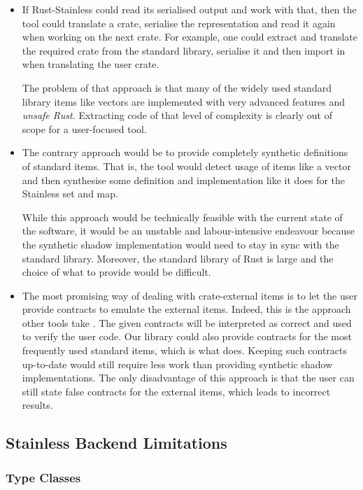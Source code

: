 \begin{itemize}
\item
  If Rust-Stainless could read its serialised output and work with that,
  then the tool could translate a crate, serialise the representation
  and read it again when working on the next crate. For example, one
  could extract and translate the required crate from the standard
  library, serialise it and then import in when translating the user
  crate.

  The problem of that approach is that many of the widely used standard
  library items like vectors are implemented with very advanced features
  and \emph{unsafe Rust.} Extracting code of that level of complexity is
  clearly out of scope for a user-focused tool.
\item
  The contrary approach would be to provide completely synthetic
  definitions of standard items. That is, the tool would detect usage of
  items like a vector and then synthesise some definition and
  implementation like it does for the Stainless set and map.

  While this approach would be technically feasible with the current
  state of the software, it would be an unstable and labour-intensive
  endeavour because the synthetic shadow implementation would need to
  stay in sync with the standard library. Moreover, the standard library
  of Rust is large and the choice of what to provide would be difficult.
\item
  The most promising way of dealing with crate-external items is to let
  the user provide contracts to emulate the external items. Indeed, this
  is the approach other tools take \cite{prusti, mirai}. The given
  contracts will be interpreted as correct and used to verify the user
  code. Our library could also provide contracts for the most frequently
  used standard items, which is what \cite{mirai} does. Keeping such
  contracts up-to-date would still require less work than providing
  synthetic shadow implementations. The only disadvantage of this
  approach is that the user can still state false contracts for the
  external items, which leads to incorrect results.
\end{itemize}

\subsection{Stainless Backend Limitations}

\subsubsection{Type Classes}


